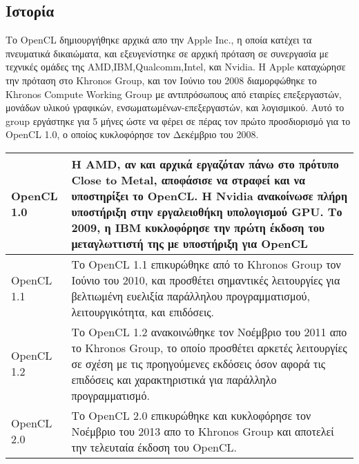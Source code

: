 \subsection{Ιστορία}
Το OpenCL δημιουργήθηκε αρχικά απο την Apple Inc., η οποία κατέχει τα πνευματικά δικαιώματα, και εξευγενίστηκε σε αρχική πρόταση σε συνεργασία με τεχνικές ομάδες της AMD,IBM,Qualcomm,Intel, και Nvidia. Η Apple καταχώρησε την πρόταση στο Khronos Group, και τον Ιούνιο του 2008 διαμορφώθηκε το Khronos Compute Working Group με αντιπρόσωπους από εταιρίες επεξεργαστών, μονάδων υλικού γραφικών, ενσωματωμένων-επεξεργαστών, και λογισμικού. Αυτό το group εργάστηκε για 5 μήνες ώστε να φέρει σε πέρας τον πρώτο προσδιορισμό για το OpenCL 1.0, ο οποίος κυκλοφόρησε τον Δεκέμβριο του 2008. 
\begin{table}[h]
	\begin{tabular}{|l|p{.9\linewidth}|}
	\hline
OpenCL 1.0 & Η AMD, αν και αρχικά εργαζόταν πάνω στο πρότυπο Close to Metal, αποφάσισε να στραφεί και να υποστηρίξει το OpenCL. Η Nvidia ανακοίνωσε πλήρη υποστήριξη στην εργαλειοθήκη υπολογισμού GPU. Το 2009, η IBM κυκλοφόρησε την πρώτη έκδοση του μεταγλωττιστή της με υποστήριξη για OpenCL\\ \hline
OpenCL 1.1 & Το OpenCL 1.1 επικυρώθηκε από το Khronos Group τον Ιούνιο του 2010, και προσθέτει σημαντικές λειτουργίες για βελτιωμένη ευελιξία παράλληλου προγραμματισμού, λειτουργικότητα, και επιδόσεις.\\ \hline
OpenCL 1.2 & Το OpenCL 1.2 ανακοινώθηκε τον Νοέμβριο του 2011 απο το Khronos Group, το οποίο προσθέτει αρκετές λειτουργίες σε σχέση με τις προηγούμενες εκδόσεις όσον αφορά τις επιδόσεις και χαρακτηριστικά για παράλληλο προγραμματισμό.\\ \hline
OpenCL 2.0 & Το OpenCL 2.0 επικυρώθηκε και κυκλοφόρησε τον Νοέμβριο του 2013 απο το Khronos Group και αποτελεί την τελευταία έκδοση του OpenCL. \\ \hline
	\end{tabular}
\end{table}

